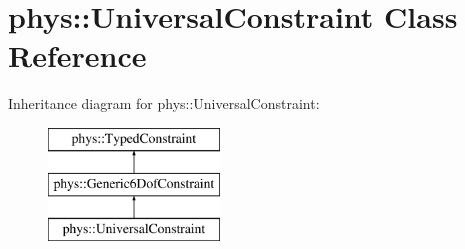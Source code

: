 \hypertarget{classphys_1_1UniversalConstraint}{
\section{phys::UniversalConstraint Class Reference}
\label{d0/d09/classphys_1_1UniversalConstraint}
}
Inheritance diagram for phys::UniversalConstraint:\begin{figure}[H]
\begin{center}
\leavevmode
\includegraphics[height=3cm]{d0/d09/classphys_1_1UniversalConstraint}
\end{center}
\end{figure}
